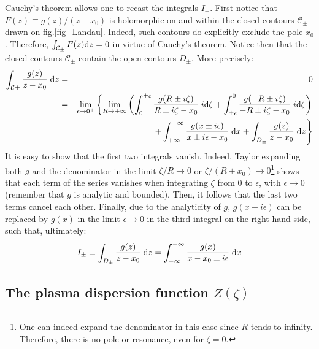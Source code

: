 \documentclass[11pt]{article}
\newcommand{\dd}{\textrm d}
\begin{document}
Cauchy's theorem allows one to recast the integrals $I_\pm$. First notice that $F(z) \equiv g(z)/(z-x_0)$ is holomorphic on and within the closed contours $\mathcal{C}_\pm$ drawn on fig.\ref{fig_Landau}. Indeed, such contours do explicitly exclude the pole $x_0$. Therefore, $\int_{\mathcal{C}_\pm} F(z)\dd z=0$ in virtue of Cauchy's theorem. Notice then that the closed contours $\mathcal{C}_\pm$ contain the open contours $D_\pm$. More precisely:
\begin{eqnarray}
 \int_{\mathcal{C}{\pm}} \frac{g(z)}{z-x_0}\; \dd z &=& 0 \nonumber\\
 &=&\lim_{\epsilon\to0^+} \left\{
 \lim_{R\to+\infty}\left(
 \int_0^{\pm\epsilon} \frac{g(R\pm i\zeta)}{R\pm i\zeta-x_0}\; i\dd \zeta +
 \int_{\pm\epsilon}^0 \frac{g(-R\pm i\zeta)}{-R\pm i\zeta-x_0}\; i\dd \zeta \right)\right.
 \nonumber \\
 &&\left. + \int_{+\infty}^{-\infty} \frac{g(x\pm i\epsilon)}{x\pm i\epsilon-x_0}\; \dd x + \int_{D_\pm} \frac{g(z)}{z-x_0}\; \dd z \right\}
 \label{eq:equiv_Cauchy}
\end{eqnarray}
It is easy to show that the first two integrals vanish. Indeed, Taylor expanding both $g$ and the denominator in the limit $\zeta/R\to0$ or $\zeta/(R\pm x_0)\to0$\footnote{One can indeed expand the denominator in this case since $R$ tends to infinity. Therefore, there is no pole or resonance, even for $\zeta=0$.} shows that each term of the series vanishes when integrating $\zeta$ from 0 to $\epsilon$, with $\epsilon\to0$ (remember that $g$ is analytic and bounded). Then, it follows that the last two terms cancel each other. Finally, due to the analyticity of $g$, $g(x\pm i\epsilon)$ can be replaced by $g(x)$ in the limit $\epsilon\to0$ in the third integral on the right hand side, such that, ultimately:
\begin{equation}
  I_\pm \equiv \int_{D_\pm} \frac{g(z)}{z-x_0}\; \dd z
  = \int_{-\infty}^{+\infty} \frac{g(x)}{x-x_0\pm i\epsilon}\; \dd x
\end{equation}


\subsection{The plasma dispersion function $Z(\zeta)$}
\end{document}
